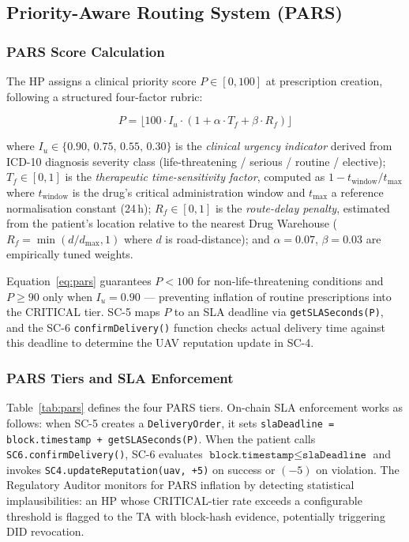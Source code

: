 \documentclass[sigplan,screen]{acmart}
\newcommand{\pars}{\textsc{PARS}\xspace}
\begin{document}
\subsection{Priority-Aware Routing System (PARS)}
\label{subsec:pars}

\subsubsection{PARS Score Calculation}

The HP assigns a clinical priority score $P \in [0,100]$ at prescription
creation, following a structured four-factor rubric:

\begin{equation}
  P = \lfloor 100 \cdot I_u \cdot (1 + \alpha \cdot T_f + \beta \cdot R_f) \rfloor
  \label{eq:pars}
\end{equation}

\noindent where $I_u \in \{0.90,\, 0.75,\, 0.55,\, 0.30\}$ is the
\emph{clinical urgency indicator} derived from ICD-10 diagnosis severity
class (life-threatening / serious / routine / elective);
$T_f \in [0,1]$ is the \emph{therapeutic time-sensitivity factor},
computed as $1 - t_{\text{window}} / t_{\text{max}}$ where $t_{\text{window}}$
is the drug's critical administration window and $t_{\text{max}}$ a reference
normalisation constant (24\,h);
$R_f \in [0,1]$ is the \emph{route-delay penalty}, estimated from the
patient's location relative to the nearest Drug Warehouse
($R_f = \min(d/d_{\text{max}}, 1)$ where $d$ is road-distance);
and $\alpha=0.07$, $\beta=0.03$ are empirically tuned weights.

Equation~\eqref{eq:pars} guarantees $P < 100$ for non-life-threatening
conditions and $P \geq 90$ only when $I_u = 0.90$ — preventing inflation
of routine prescriptions into the CRITICAL tier.
SC-5 maps $P$ to an SLA deadline via \texttt{getSLASeconds(P)}, and the
SC-6 \texttt{confirmDelivery()} function checks actual delivery time against
this deadline to determine the UAV reputation update in SC-4.

\subsubsection{PARS Tiers and SLA Enforcement}

Table~\ref{tab:pars} defines the four \pars tiers.
On-chain SLA enforcement works as follows: when SC-5 creates a
\texttt{DeliveryOrder}, it sets \texttt{slaDeadline = block.timestamp +
getSLASeconds(P)}.
When the patient calls \texttt{SC6.confirmDelivery()}, SC-6 evaluates
$\texttt{block.timestamp} \leq \texttt{slaDeadline}$ and invokes
\texttt{SC4.updateReputation(uav, +5)} on success or $(-5)$ on violation.
The Regulatory Auditor monitors for PARS inflation by detecting statistical
implausibilities: an HP whose CRITICAL-tier rate exceeds a configurable
threshold is flagged to the TA with block-hash evidence, potentially
triggering DID revocation.
\end{document}
